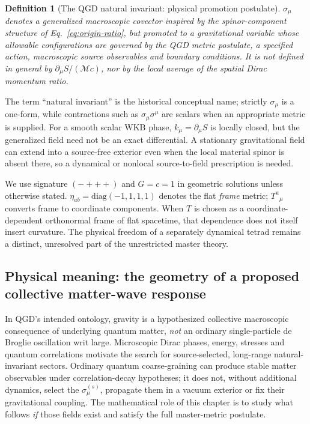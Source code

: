 \documentclass[11pt,a4paper]{article}
\newcommand{\mc}{\mathcal M}
\newtheorem{definition}[theorem]{Definition}
\begin{document}
\begin{definition}[The QGD natural invariant: physical promotion postulate]\label{def:natural-invariant}
$\sigma_\mu$ denotes a generalized macroscopic covector inspired by the spinor-component structure of Eq.~\eqref{eq:origin-ratio}, but \emph{promoted} to a gravitational variable whose allowable configurations are governed by the QGD metric postulate, a specified action, macroscopic source observables and boundary conditions. It is not defined in general by $\partial_\mu S/(\mc c)$, nor by the local average of the spatial Dirac momentum ratio.
\end{definition}
The term ``natural invariant'' is the historical conceptual name; strictly $\sigma_\mu$ is a one-form, while contractions such as $\sigma_\mu\sigma^\mu$ are scalars when an appropriate metric is supplied. For a smooth scalar WKB phase, $k_\mu=\partial_\mu S$ is locally closed, but the generalized field need not be an exact differential. A stationary gravitational field can extend into a source-free exterior even when the local material spinor is absent there, so a dynamical or nonlocal source-to-field prescription is needed.

We use signature $(-+++)$ and $G=c=1$ in geometric solutions unless otherwise stated. $\eta_{ab}=\mathrm{diag}(-1,1,1,1)$ denotes the flat \emph{frame} metric; $T^a{}_\mu$ converts frame to coordinate components. When $T$ is chosen as a coordinate-dependent orthonormal frame of flat spacetime, that dependence does not itself insert curvature. The physical freedom of a separately dynamical tetrad remains a distinct, unresolved part of the unrestricted master theory.


\subsection*{Physical meaning: the geometry of a proposed collective matter-wave response}\label{sec:qgd064-interpretation}
In QGD's intended ontology, gravity is a hypothesized collective macroscopic consequence of underlying quantum matter, \emph{not} an ordinary single-particle de Broglie oscillation writ large. Microscopic Dirac phases, energy, stresses and quantum correlations motivate the search for source-selected, long-range natural-invariant sectors. Ordinary quantum coarse-graining can produce stable matter observables under correlation-decay hypotheses; it does not, without additional dynamics, select the $\sigma_\mu^{(s)}$, propagate them in a vacuum exterior or fix their gravitational coupling.  The mathematical role of this chapter is to study what follows \emph{if} those fields exist and satisfy the full master-metric postulate.
\end{document}
